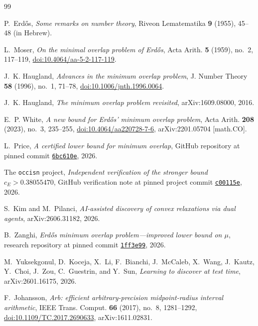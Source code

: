 \begin{thebibliography}{99}

P.~Erd\H{o}s,
\emph{Some remarks on number theory},
Riveon Lematematika \textbf{9} (1955), 45--48 (in Hebrew).

L.~Moser,
\emph{On the minimal overlap problem of Erd\H{o}s},
Acta Arith. \textbf{5} (1959), no.~2, 117--119,
\href{https://doi.org/10.4064/aa-5-2-117-119}{doi:10.4064/aa-5-2-117-119}.

J.~K. Haugland,
\emph{Advances in the minimum overlap problem},
J. Number Theory \textbf{58} (1996), no.~1, 71--78,
\href{https://doi.org/10.1006/jnth.1996.0064}{doi:10.1006/jnth.1996.0064}.

J.~K. Haugland,
\emph{The minimum overlap problem revisited},
arXiv:1609.08000, 2016.

E.~P. White,
\emph{A new bound for Erd\H{o}s' minimum overlap problem},
Acta Arith. \textbf{208} (2023), no.~3, 235--255,
\href{https://doi.org/10.4064/aa220728-7-6}{doi:10.4064/aa220728-7-6},
arXiv:2201.05704 [math.CO].

L.~Price,
\emph{A certified lower bound for minimum overlap},
GitHub repository at pinned commit
\href{https://github.com/Leeham06972452/erdos-36-lower-bound/tree/6bc610e40083ef61a40966dfb5d38612cabc4c5b}%
{\texttt{6bc610e}}, 2026.


The \texttt{occisn} project,
\emph{Independent verification of the stronger bound $c_E>0.38055470$},
GitHub verification note at pinned project commit
\href{https://github.com/occisn/erdos-36-certified-lower-bound/blob/c00115e9156e02c9c75117949c7a456346d73101/docs/INDEPENDENT_VERIFICATION.md}%
{\texttt{c00115e}}, 2026.

S.~Kim and M.~Pilanci,
\emph{AI-assisted discovery of convex relaxations via dual agents},
arXiv:2606.31182, 2026.

B.~Zanghi,
\emph{Erd\H{o}s minimum overlap problem---improved lower bound on $\mu$},
research repository at pinned commit
\href{https://github.com/bzanghi/erdos-minimum-overlap-bochner/tree/1ff3e99d12c75755dfee5620d097e8f781420d3f}%
{\texttt{1ff3e99}}, 2026.

M.~Yuksekgonul, D.~Koceja, X.~Li, F.~Bianchi, J.~McCaleb,
X.~Wang, J.~Kautz, Y.~Choi, J.~Zou, C.~Guestrin, and Y.~Sun,
\emph{Learning to discover at test time},
arXiv:2601.16175, 2026.

F.~Johansson,
\emph{Arb: efficient arbitrary-precision midpoint-radius interval arithmetic},
IEEE Trans. Comput. \textbf{66} (2017), no.~8, 1281--1292,
\href{https://doi.org/10.1109/TC.2017.2690633}{doi:10.1109/TC.2017.2690633},
arXiv:1611.02831.

\end{thebibliography}
